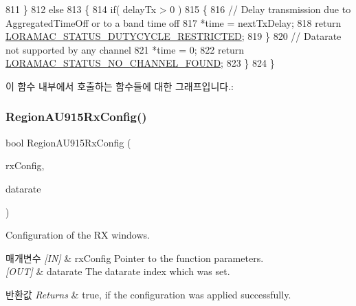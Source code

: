 \begin{DoxyCode}
811     \}
812     \textcolor{keywordflow}{else}
813     \{
814         \textcolor{keywordflow}{if}( delayTx > 0 )
815         \{
816             \textcolor{comment}{// Delay transmission due to AggregatedTimeOff or to a band time off}
817             *time = nextTxDelay;
818             \textcolor{keywordflow}{return} \mbox{\hyperlink{group___l_o_r_a_m_a_c_gga1d18f26b344040b3ec5c3db662919661a0c982ada0769ecee2e1041fb6945ddd4}{LORAMAC\_STATUS\_DUTYCYCLE\_RESTRICTED}};
819         \}
820         \textcolor{comment}{// Datarate not supported by any channel}
821         *time = 0;
822         \textcolor{keywordflow}{return} \mbox{\hyperlink{group___l_o_r_a_m_a_c_gga1d18f26b344040b3ec5c3db662919661a393266a9952cf6617917f1fce181efcd}{LORAMAC\_STATUS\_NO\_CHANNEL\_FOUND}};
823     \}
824 \}
\end{DoxyCode}
이 함수 내부에서 호출하는 함수들에 대한 그래프입니다.\+:
\mbox{\label{group___r_e_g_i_o_n_a_u915_gaf80c46b490d80c77aa137a5abe70c073}} 
\subsubsection{\texorpdfstring{Region\+A\+U915\+Rx\+Config()}{RegionAU915RxConfig()}}
{\footnotesize\ttfamily bool Region\+A\+U915\+Rx\+Config (\begin{DoxyParamCaption}\item[{\mbox{\hyperlink{group___r_e_g_i_o_n_ga375c038078dfcfc7ef14280021db719e}{Rx\+Config\+Params\+\_\+t}} $\ast$}]{rx\+Config,  }\item[{int8\+\_\+t $\ast$}]{datarate }\end{DoxyParamCaption})}



Configuration of the RX windows. 


\begin{DoxyParams}{매개변수}
{\em \mbox{[}\+I\+N\mbox{]}} & rx\+Config Pointer to the function parameters.\\
\hline
{\em \mbox{[}\+O\+U\+T\mbox{]}} & datarate The datarate index which was set.\\
\hline
\end{DoxyParams}

\begin{DoxyRetVals}{반환값}
{\em Returns} & true, if the configuration was applied successfully. \\
\hline
\end{DoxyRetVals}



